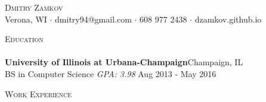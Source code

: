 \documentclass[a4paper]{article}
\newcommand{\lineunder} {
    \vspace*{-8pt} \\
    \hspace*{-18pt} \hrulefill \\
}
\newcommand{\header} [1] {
    {\hspace*{-18pt}\vspace*{6pt} \textsc{#1}}
    \vspace*{-6pt} \lineunder
}
\begin{document}
\vspace*{-40pt}

    

\vspace*{-10pt}
\begin{center}
	{\Huge \scshape {Dmitry Zamkov}}\\
	Verona, WI $\cdot$ dmitry94@gmail.com $\cdot$ 608 977 2438 $\cdot$ dzamkov.github.io\\
\end{center}

\header{Education}
\textbf{University of Illinois at Urbana-Champaign}\hfill Champaign, IL\\
BS in Computer Science \textit{GPA: 3.98} \hfill Aug 2013 - May 2016\\
\vspace{2mm}

\header{Work Experience}
\vspace{1mm}
\end{document}
